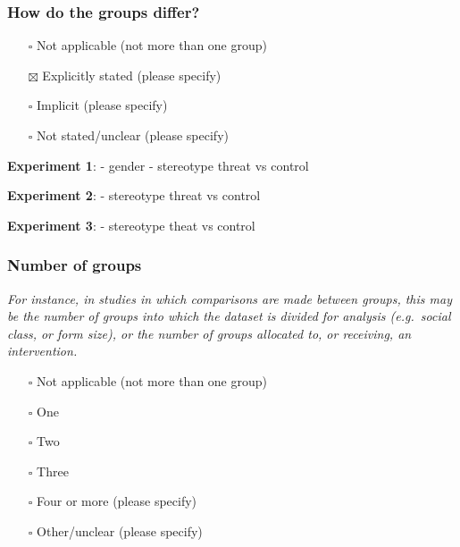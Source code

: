 \documentclass[
  doc, a4paper]{apa7}
\providecommand{\tightlist}{%
  \setlength{\itemsep}{0pt}\setlength{\parskip}{0pt}}
\begin{document}
\subsubsection{How do the groups differ?}\label{how-do-the-groups-differ}

\begin{itemize}
\tightlist
\item[$\square$]
  Not applicable (not more than one group)\\
\item[$\boxtimes$]
  Explicitly stated (please specify)\\
\item[$\square$]
  Implicit (please specify)\\
\item[$\square$]
  Not stated/unclear (please specify)
\end{itemize}

\textbf{Experiment 1}:
- gender
- stereotype threat vs control

\textbf{Experiment 2}:
- stereotype threat vs control

\textbf{Experiment 3}:
- stereotype theat vs control

\subsubsection{Number of groups}\label{number-of-groups}

\emph{For instance, in studies in which comparisons are made between groups, this may be the number of groups into which the dataset is divided for analysis (e.g.~social class, or form size), or the number of groups allocated to, or receiving, an intervention.}

\begin{itemize}
\tightlist
\item[$\square$]
  Not applicable (not more than one group)\\
\item[$\square$]
  One\\
\item[$\square$]
  Two\\
\item[$\square$]
  Three\\
\item[$\square$]
  Four or more (please specify)\\
\item[$\square$]
  Other/unclear (please specify)
\end{itemize}
\end{document}

